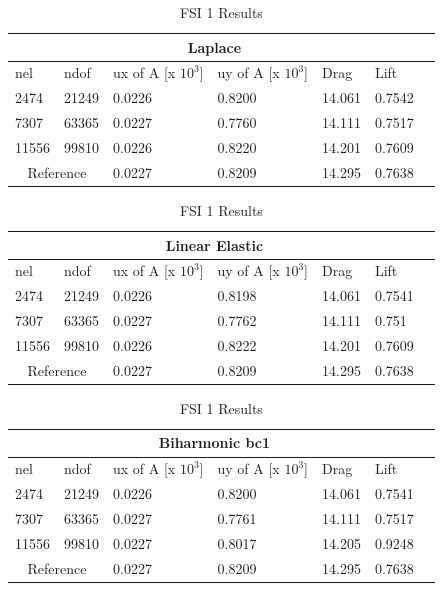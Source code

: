 \begin{table}[h!]
\centering
\caption{FSI 1 Results}
\label{FSI1 Results}
\begin{tabular}{ |p{1cm}||p{1cm}|p{2.5cm}|p{2.5cm}|p{2.7cm}|p{2.7cm}|p{1.2cm}|}
 \hline
  \multicolumn{6}{|c|}{Laplace} \\
   \hline
nel & ndof & ux of A [x $10^{3}$]  &uy of A [x $10^{3}$]& Drag  & Lift \\
 \hline
 2474    & 21249  &       0.0226 &       0.8200 & 14.061 & 0.7542 \\
 7307    & 63365  &       0.0227 &       0.7760 & 14.111 & 0.7517 \\
 11556   & 99810  &       0.0226 &      0.8220 & 14.201 & 0.7609 \\
  \hline
 \multicolumn{2}{|c|}{Reference} &  0.0227      &       0.8209      & 14.295  & 0.7638   \\
 \hline
\end{tabular}
\begin{tabular}{ |p{1cm}||p{1cm}|p{2.5cm}|p{2.5cm}|p{2.7cm}|p{2.7cm}|p{1.2cm}|}
 \hline
  \multicolumn{6}{|c|}{Linear Elastic} \\
   \hline
nel & ndof & ux of A [x $10^{3}$]  &uy of A [x $10^{3}$]& Drag  & Lift \\
 \hline
 2474    & 21249  &       0.0226 &       0.8198 & 14.061 & 0.7541 \\
 7307    & 63365  &       0.0227 &       0.7762 & 14.111 & 0.751  \\
 11556   & 99810  &       0.0226  &       0.8222 & 14.201 & 0.7609 \\
  \hline
 \multicolumn{2}{|c|}{Reference} &  0.0227      &       0.8209      & 14.295  & 0.7638   \\
 \hline
\end{tabular}
\begin{tabular}{ |p{1cm}||p{1cm}|p{2.5cm}|p{2.5cm}|p{2.7cm}|p{2.7cm}|p{1.2cm}|}
 \hline
  \multicolumn{6}{|c|}{Biharmonic bc1} \\
   \hline
nel & ndof & ux of A [x $10^{3}$]  &uy of A [x $10^{3}$]& Drag  & Lift \\
 \hline
 2474    & 21249  &       0.0226 &       0.8200 & 14.061 & 0.7541 \\
 7307    & 63365  &       0.0227  &       0.7761 & 14.111 & 0.7517 \\
 11556   & 99810  &       0.0227  &       0.8017 & 14.205 & 0.9248 \\
  \hline
 \multicolumn{2}{|c|}{Reference} &  0.0227      &       0.8209      & 14.295  & 0.7638   \\

\end{tabular}
\end{table}
